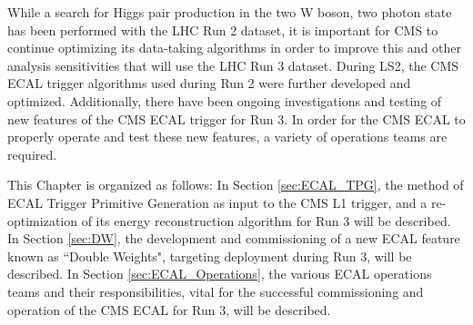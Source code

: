 While a search for Higgs pair production in the two W boson, two photon state has been performed with the LHC Run 2 dataset, it is important for CMS to continue optimizing its data-taking algorithms in order to improve this and other analysis sensitivities that will use the LHC Run 3 dataset. During LS2, the CMS ECAL trigger algorithms used during Run 2 were further developed and optimized. Additionally, there have been ongoing investigations and testing of new features of the CMS ECAL trigger for Run 3. In order for the CMS ECAL to properly operate and test these new features, a variety of operations teams are required.

This Chapter is organized as follows: In Section \ref{sec:ECAL_TPG}, the method of ECAL Trigger Primitive Generation as input to the CMS L1 trigger, and a re-optimization of its energy reconstruction algorithm for Run 3 will be described. In Section \ref{sec:DW}, the development and commissioning of a new ECAL feature known as ``Double Weights", targeting deployment during Run 3, will be described. In Section \ref{sec:ECAL_Operations}, the various ECAL operations teams and their responsibilities, vital for the successful commissioning and operation of the CMS ECAL for Run 3, will be described.   


